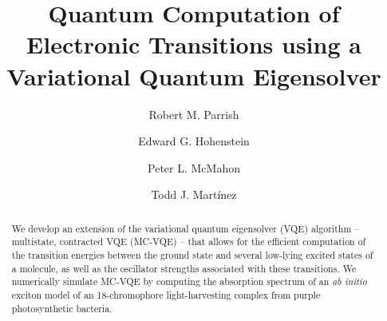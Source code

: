 \documentclass[aps,prl,twocolumn,showpacs,superscriptaddress,groupedaddress]{revtex4}  %
\begin{document}
\title{
Quantum Computation of Electronic Transitions using a Variational Quantum
Eigensolver
}

\author{Robert M. Parrish}

\author{Edward G. Hohenstein}

\author{Peter L. McMahon}

\author{Todd J. Mart\'inez}

\begin{abstract} 
We develop an extension of the variational quantum eigensolver (VQE) algorithm
-- multistate, contracted VQE (MC-VQE) -- that allows for the efficient
computation of the transition energies between the ground state and several
low-lying excited states of a molecule, as well as the oscillator strengths
associated with these transitions. We numerically simulate MC-VQE by computing
the absorption spectrum of an \emph{ab initio} exciton model of an
18-chromophore light-harvesting complex from purple photosynthetic bacteria. 
\end{abstract}


\maketitle
\end{document}
